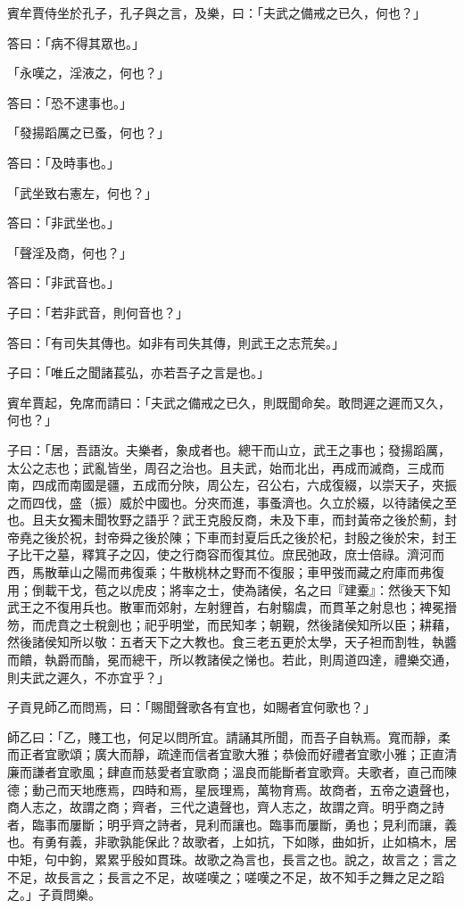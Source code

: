 \begin{pinyinscope}
賓牟賈侍坐於孔子，孔子與之言，及樂，曰：「夫武之備戒之已久，何也？」

答曰：「病不得其眾也。」

「永嘆之，淫液之，何也？」

答曰：「恐不逮事也。」

「發揚蹈厲之已蚤，何也？」

答曰：「及時事也。」

「武坐致右憲左，何也？」

答曰：「非武坐也。」

「聲淫及商，何也？」

答曰：「非武音也。」

子曰：「若非武音，則何音也？」

答曰：「有司失其傳也。如非有司失其傳，則武王之志荒矣。」

子曰：「唯丘之聞諸萇弘，亦若吾子之言是也。」

賓牟賈起，免席而請曰：「夫武之備戒之已久，則既聞命矣。敢問遲之遲而又久，何也？」

子曰：「居，吾語汝。夫樂者，象成者也。總干而山立，武王之事也；發揚蹈厲，太公之志也；武亂皆坐，周召之治也。且夫武，始而北出，再成而滅商，三成而南，四成而南國是疆，五成而分陜，周公左，召公右，六成復綴，以崇天子，夾振之而四伐，盛（振）威於中國也。分夾而進，事蚤濟也。久立於綴，以待諸侯之至也。且夫女獨未聞牧野之語乎？武王克殷反商，未及下車，而封黃帝之後於薊，封帝堯之後於祝，封帝舜之後於陳；下車而封夏后氏之後於杞，封殷之後於宋，封王子比干之墓，釋箕子之囚，使之行商容而復其位。庶民弛政，庶士倍祿。濟河而西，馬散華山之陽而弗復乘；牛散桃林之野而不復服；車甲弢而藏之府庫而弗復用；倒載干戈，苞之以虎皮；將率之士，使為諸侯，名之曰『建櫜』：然後天下知武王之不復用兵也。散軍而郊射，左射貍首，右射騶虞，而貫革之射息也；裨冕搢笏，而虎賁之士稅劍也；祀乎明堂，而民知孝；朝覲，然後諸侯知所以臣；耕藉，然後諸侯知所以敬：五者天下之大教也。食三老五更於太學，天子袒而割牲，執醬而饋，執爵而酳，冕而總干，所以教諸侯之悌也。若此，則周道四達，禮樂交通，則夫武之遲久，不亦宜乎？」

子貢見師乙而問焉，曰：「賜聞聲歌各有宜也，如賜者宜何歌也？」

師乙曰：「乙，賤工也，何足以問所宜。請誦其所聞，而吾子自執焉。寬而靜，柔而正者宜歌頌；廣大而靜，疏達而信者宜歌大雅；恭儉而好禮者宜歌小雅；正直清廉而謙者宜歌風；肆直而慈愛者宜歌商；溫良而能斷者宜歌齊。夫歌者，直己而陳德；動己而天地應焉，四時和焉，星辰理焉，萬物育焉。故商者，五帝之遺聲也，商人志之，故謂之商；齊者，三代之遺聲也，齊人志之，故謂之齊。明乎商之詩者，臨事而屢斷；明乎齊之詩者，見利而讓也。臨事而屢斷，勇也；見利而讓，義也。有勇有義，非歌孰能保此？故歌者，上如抗，下如隊，曲如折，止如槁木，居中矩，句中鉤，累累乎殷如貫珠。故歌之為言也，長言之也。說之，故言之；言之不足，故長言之；長言之不足，故嗟嘆之；嗟嘆之不足，故不知手之舞之足之蹈之。」子貢問樂。


\end{pinyinscope}
